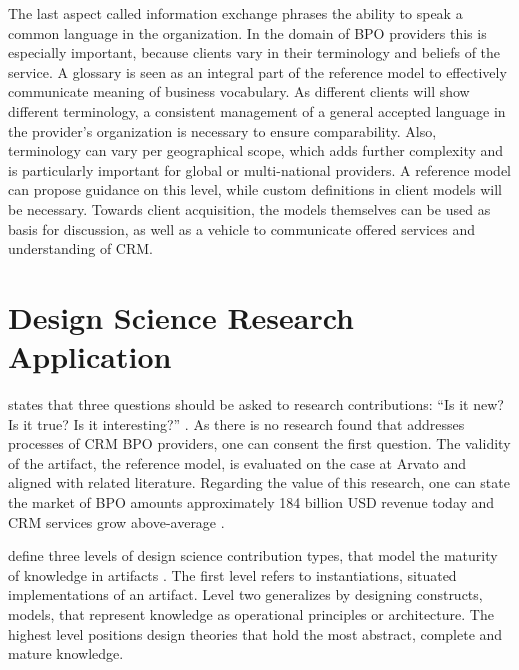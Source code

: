 The last aspect called information exchange phrases the ability to speak a common language in the organization. In the domain of BPO providers this is especially important, because clients vary in their terminology and beliefs of the service. A glossary is seen as an integral part of the reference model to effectively communicate meaning of business vocabulary. As different clients will show different terminology, a consistent management of a general accepted language in the provider’s organization is necessary to ensure comparability. Also, terminology can vary per geographical scope, which adds further complexity and is particularly important for global or multi-national providers. A reference model can propose guidance on this level, while custom definitions in client models will be necessary. Towards client acquisition, the models themselves can be used as basis for discussion, as well as a vehicle to communicate offered services and understanding of CRM.


%

\section{Design Science Research Application}

 \citeauthor{wilson2002responsible} states that three questions should be asked to research contributions: \enquote{Is it new? Is it true? Is it interesting?} \citep[]{wilson2002responsible}. As there is no research found that addresses processes of CRM BPO providers, one can consent the first question. The validity of the artifact, \viz the reference model, is evaluated on the case at Arvato and aligned with related literature. Regarding the value of this research, one can state the market of BPO amounts approximately 184 billion USD revenue today and CRM services grow above-average \citep{hfs2016top}. 

\citeauthor{gregor2013positioning} define three levels of design science contribution types, that model the maturity of knowledge in artifacts \citep{gregor2013positioning}. The first level refers to instantiations, \ie situated implementations of an artifact. Level two generalizes by designing constructs, models, that represent knowledge as operational principles or architecture. The highest level positions design theories that hold the most abstract, complete and mature knowledge. 

